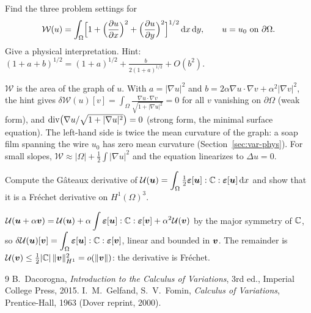 \label{exo:A-minimal}
Find the three problem settings for
\[
  \mathcal W(u)=\int_\Omega\Bigl[1+\Bigl(\frac{\partial u}{\partial x}\Bigr)^2
  +\Bigl(\frac{\partial u}{\partial y}\Bigr)^2\Bigr]^{1/2}\,\mathrm{d} x\,\mathrm{d} y,
  \qquad u=u_0\ \text{on }\partial\Omega .
\]
Give a physical interpretation. Hint:
$\displaystyle (1+a+b)^{1/2}=(1+a)^{1/2}+\frac{b}{2(1+a)^{1/2}}+O(b^2)$.
\begin{solution}
$\mathcal W$ is the area of the graph of $u$. With
$a=|\nabla u|^2$ and $b=2\alpha\nabla u\cdot\nabla v+\alpha^2|\nabla v|^2$, the hint
gives
$\displaystyle \delta\mathcal W(u)[v]=\int_\Omega\frac{\nabla u\cdot\nabla v}{\sqrt{1+|\nabla u|^2}}=0$
for all $v$ vanishing on $\partial\Omega$ (weak form), and
$\operatorname{div}\bigl(\nabla u/\sqrt{1+|\nabla u|^2}\bigr)=0$ (strong form, the minimal
surface equation). The left-hand side is twice the mean curvature of the
graph: a soap film spanning the wire $u_0$ has zero mean curvature
(Section~\ref{sec:var-phys}). For small slopes, $\displaystyle \mathcal W\approx|\Omega|+\tfrac12\int|\nabla u|^2$
and the equation linearizes to $\Delta u=0$.
\end{solution}

\label{exo:A-elastic}
Compute the G\^ateaux derivative of
$\displaystyle \mathcal U(\bm{u})=\int_\Omega\tfrac12\bm{\varepsilon}[\bm{u}]:\mathbb{C}:\bm{\varepsilon}[\bm{u}]\,\mathrm{d} x$ and show that
it is a Fr\'echet derivative on $H^1(\Omega)^3$.
\begin{solution}
$\displaystyle \mathcal U(\bm{u}+\alpha\bm{v})=\mathcal U(\bm{u})+\alpha\int\bm{\varepsilon}[\bm{u}]:\mathbb{C}:\bm{\varepsilon}[\bm{v}]+\alpha^2\mathcal U(\bm{v})$
by the major symmetry of $\mathbb{C}$, so
$\displaystyle \delta\mathcal U(\bm{u})[\bm{v}]=\int_\Omega\bm{\varepsilon}[\bm{u}]:\mathbb{C}:\bm{\varepsilon}[\bm{v}]$, linear and bounded
in $\bm{v}$. The remainder is $\mathcal U(\bm{v})\le\tfrac12|\mathbb{C}|\,\lVert \bm{v}\rVert_{H^1}^2=o(\lVert \bm{v}\rVert)$:
the derivative is Fr\'echet.
\end{solution}

\begin{chapterbib}{9}
 B.~Dacorogna, \emph{Introduction to the Calculus of Variations}, 3rd ed., Imperial College Press, 2015.
 I.~M.~Gelfand, S.~V.~Fomin, \emph{Calculus of Variations}, Prentice-Hall, 1963 (Dover reprint, 2000).
\end{chapterbib}
